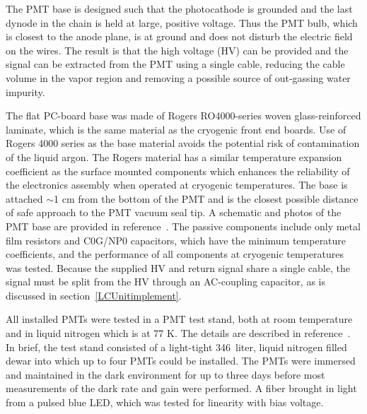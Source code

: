 The PMT base is designed such that the photocathode is 
grounded and the last dynode in the chain is held at large, positive voltage. 
Thus the PMT bulb, which is closest to the \lartpc anode plane, 
is at ground and does not disturb the electric field on the wires.  
The result is that the high voltage (HV) can be provided and the signal can be extracted from the PMT using a single cable, 
reducing the cable volume in the vapor region and removing a possible source of out-gassing water impurity.

The flat PC-board base was made of Rogers RO4000-series woven glass-reinforced laminate, 
which is the same material as the \lartpc cryogenic front end boards.  Use of Rogers 4000 series as the base material avoids the potential risk of contamination of the liquid argon. The Rogers material has a similar temperature expansion coefficient as the surface mounted components which enhances the reliability of the electronics assembly when operated at cryogenic temperatures.  The base is attached $\sim$1 cm from the bottom of the PMT and is the closest possible distance of safe approach to the PMT vacuum seal tip.   
A schematic and photos of the PMT base are provided in reference~\cite{Briese:2013wua}. 
The passive components include only metal film resistors and C0G/NP0 capacitors, 
which have the minimum temperature coefficients, and the performance of all components at cryogenic temperatures was tested.  
Because the supplied HV and return signal share a single cable, the signal must be split from the HV through an AC-coupling capacitor, as is discussed in section~\ref{LCUnitimplement}.

All installed PMTs were tested in a PMT test stand, both
at room temperature and in liquid nitrogen which is at 77 K.  
The details are described in reference~\cite{Briese:2013wua}.  
In brief, the test stand consisted of a light-tight 346~liter, 
liquid nitrogen filled dewar into which up to four PMTs could be installed. 
The PMTs were immersed and maintained in the dark environment 
for up to three days before most measurements of the dark rate and gain were performed.  
A fiber brought in light from a pulsed blue LED, which was tested for linearity with bias voltage.  


